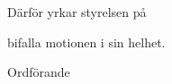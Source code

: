 \documentclass[../_main/handlingar.tex]{subfiles}
\begin{document}
\motionssvar


Därför yrkar styrelsen på
\begin{attsatser}
    \att bifalla motionen i sin helhet.
\end{attsatser}

\begin{signatures}{1}
    \ist
    \signature{Fredrik Peterson}{Ordförande}
\end{signatures}
\end{document}
